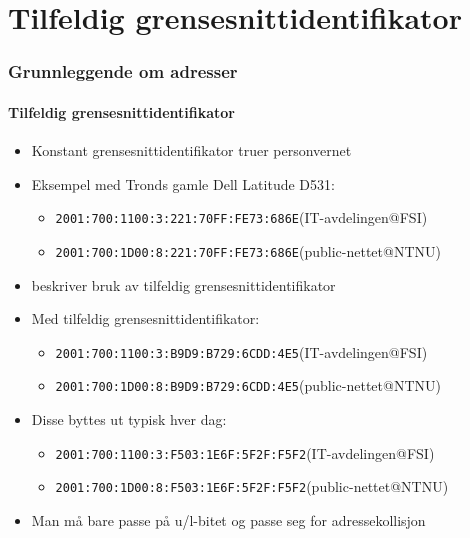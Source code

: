 \section{Tilfeldig grensesnittidentifikator}
\begin{frame}%
  \frametitle{Grunnleggende om adresser}
  \framesubtitle{Tilfeldig grensesnittidentifikator}
  \begin{itemize}%
  \item Konstant grensesnittidentifikator truer personvernet
  \item Eksempel med Tronds gamle Dell Latitude D531:
    \begin{itemize}%
    \item \texttt{2001:700:1100:3:\alert{221:70FF:FE73:686E}}\hfill(IT-avdelingen@FSI)
    \item \texttt{2001:700:1D00:8:\alert{221:70FF:FE73:686E}}\hfill(public-nettet@NTNU)
    \end{itemize}
  \item {} beskriver bruk av tilfeldig grensesnittidentifikator
  \item Med tilfeldig grensesnittidentifikator:
    \begin{itemize}%
    \item \texttt{2001:700:1100:3:\alert{B9D9:B729:6CDD:4E5}}\hfill(IT-avdelingen@FSI)
    \item \texttt{2001:700:1D00:8:\alert{B9D9:B729:6CDD:4E5}}\hfill(public-nettet@NTNU)
    \end{itemize}
  \item Disse byttes ut typisk hver dag:
    \begin{itemize}%
    \item \texttt{2001:700:1100:3:\alert{F503:1E6F:5F2F:F5F2}}\hfill(IT-avdelingen@FSI)
    \item \texttt{2001:700:1D00:8:\alert{F503:1E6F:5F2F:F5F2}}\hfill(public-nettet@NTNU)
    \end{itemize}
  \item Man må bare passe på u/l-bitet og passe seg for adressekollisjon
  \end{itemize}
\end{frame}

